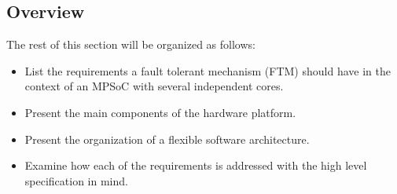 \subsection{Overview}

The rest of this section will be organized as follows:
\begin{itemize}

\item{List the requirements a fault tolerant mechanism (FTM) should have in the context of an MPSoC with several independent cores.}
\item{Present the main components of the hardware platform.}
\item{Present the organization of a flexible software architecture.}
\item{Examine how each of the requirements is addressed with the high level specification in mind.}
\end{itemize}



